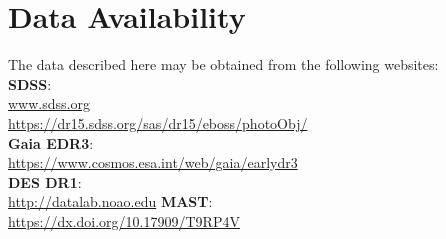 \documentclass[fleqn,usenatbib]{mnras}
\begin{document}
\section*{Data Availability}
The data described here may be obtained from the following websites: \\
{\bf SDSS}:\\
\url{www.sdss.org}\\ 
\url{https://dr15.sdss.org/sas/dr15/eboss/photoObj/}\\
{\bf Gaia EDR3}:\\
\url{https://www.cosmos.esa.int/web/gaia/earlydr3}\\
{\bf DES DR1}:\\
\url{http://datalab.noao.edu}
{\bf MAST}:\\
\url{https://dx.doi.org/10.17909/T9RP4V}
















\bsp	%
\label{lastpage}
\end{document}
